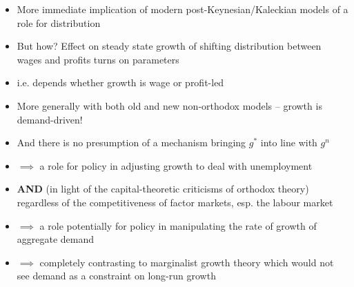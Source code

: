 \documentclass{article}
\begin{document}
\begin{itemize}
	\item More immediate implication of modern post-Keynesian/Kaleckian models of a role for distribution
	\item But how? Effect on steady state growth of shifting distribution between wages and profits turns on parameters 
	\item i.e. depends whether growth is wage or profit-led
	\item More generally with both old and new non-orthodox models -- growth is demand-driven!
	\item And there is no presumption of a mechanism bringing \( g^\ast \)  into line with \( g^n \) 
	\item \( \implies \) a role for policy in adjusting growth to deal with unemployment
	\item \textbf{AND} (in light of the capital-theoretic criticisms of orthodox theory) regardless of the competitiveness of factor markets, esp. the labour market
	\item \( \implies \) a role potentially for policy in manipulating the rate of growth of aggregate demand
	\item \( \implies \) completely contrasting to marginalist growth theory which would not see demand as a constraint on long-run growth
\end{itemize}
\end{document}
